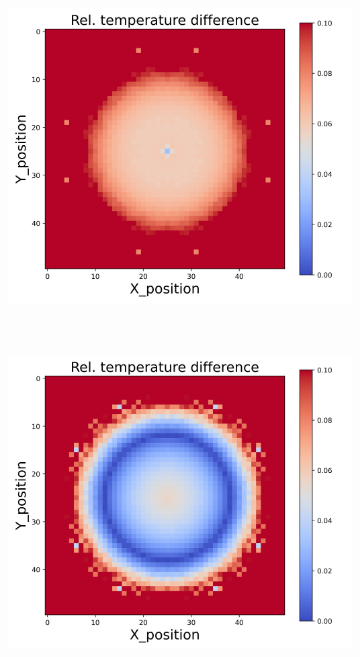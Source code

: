 {\begin{figure}[h]
\begin{minipage}{\textwidth}
\begin{subfigure}{0.27\textwidth}
        \end{subfigure}
        \begin{subfigure}{0.27\textwidth}
            \centering
            \includegraphics[width=\textwidth]{figures/raw_data/21/exp/T_bias.jpg}
        \end{subfigure}
    \end{minipage}\\
    \begin{minipage}{\textwidth}
        \centering
        \begin{subfigure}{0.27\textwidth}
            \centering
            \includegraphics[width=\textwidth]{figures/raw_data/22/exp/T_bias.jpg}

\end{subfigure}
\end{minipage}
\end{figure}}
